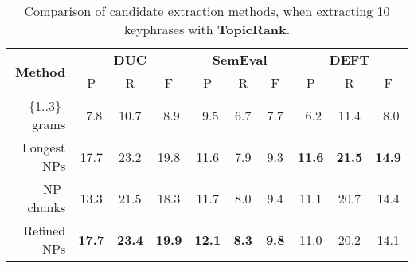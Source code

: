      \begin{table}
        \centering
        \begin{tabular}{rccccccccc}
          \toprule
          \multirow{2}{*}[-2pt]{\textbf{Method}} & \multicolumn{3}{c}{\textbf{DUC}} & \multicolumn{3}{c}{\textbf{SemEval}} & \multicolumn{3}{c}{\textbf{DEFT}}\\
          \cmidrule(r){2-4}\cmidrule(lr){5-7}\cmidrule(l){8-10}
          & P & R & F & P & R & F & P & R & F\\
          \midrule
          \{1..3\}-grams & $~~$7.8 & 10.7 & $~~$8.9 & $~~$9.5 & $~~$6.7 & $~~$7.7 & $~~$6.2 & 11.4 & $~~$8.0\\
          Longest NPs & 17.7 & 23.2 & 19.8 & 11.6 & $~~$7.9 & $~~$9.3 & \textbf{11.6} & \textbf{21.5} & \textbf{14.9}\\
          NP-chunks & 13.3 & 21.5 & 18.3 & 11.7 & $~~$8.0 & $~~$9.4 & 11.1 & 20.7 & 14.4\\
          Refined NPs & \textbf{17.7} & \textbf{23.4} & \textbf{19.9} & \textbf{12.1} & \textbf{$~~$8.3} & \textbf{$~~$9.8} & 11.0 & 20.2 & 14.1\\
          \bottomrule
        \end{tabular}
        \caption{Comparison of candidate extraction methods, when extracting 10
                 keyphrases with \textbf{TopicRank}.
                 \label{tab:topicrank_results}}
      \end{table}
